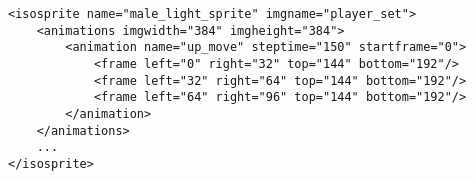 \begin{lstlisting}
<isosprite name="male_light_sprite"	imgname="player_set">
	<animations imgwidth="384" imgheight="384">
		<animation name="up_move" steptime="150" startframe="0">
			<frame left="0" right="32" top="144" bottom="192"/>
			<frame left="32" right="64" top="144" bottom="192"/>
			<frame left="64" right="96" top="144" bottom="192"/>
		</animation>
	</animations>
	...
</isosprite>

\end{lstlisting}
















